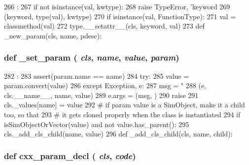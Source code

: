 \begin{DoxyCode}
266                                                :
267         if not isinstance(val, kwtype):
268             raise TypeError, 'keyword %
269                   (keyword, type(val), kwtype)
270         if isinstance(val, FunctionType):
271             val = classmethod(val)
272         type.__setattr__(cls, keyword, val)
273 
    def _new_param(cls, name, pdesc):
\end{DoxyCode}
\hypertarget{classm5_1_1SimObject_1_1MetaSimObject_ad9738835519febeb368f901e6185df14}{
\subsubsection[{\_\-set\_\-param}]{\setlength{\rightskip}{0pt plus 5cm}def \_\-set\_\-param ( {\em cls}, \/   {\em name}, \/   {\em value}, \/   {\em param})}}
\label{classm5_1_1SimObject_1_1MetaSimObject_ad9738835519febeb368f901e6185df14}



\begin{DoxyCode}
282                                            :
283         assert(param.name == name)
284         try:
285             value = param.convert(value)
286         except Exception, e:
287             msg = "%
288                   (e, cls.__name__, name, value)
289             e.args = (msg, )
290             raise
291         cls._values[name] = value
292         # if param value is a SimObject, make it a child too, so that
293         # it gets cloned properly when the class is instantiated
294         if isSimObjectOrVector(value) and not value.has_parent():
295             cls._add_cls_child(name, value)
296 
    def _add_cls_child(cls, name, child):
\end{DoxyCode}
\hypertarget{classm5_1_1SimObject_1_1MetaSimObject_af533aa789436bfde5727387a36ca9178}{
\subsubsection[{cxx\_\-param\_\-decl}]{\setlength{\rightskip}{0pt plus 5cm}def cxx\_\-param\_\-decl ( {\em cls}, \/   {\em code})}}
\label{classm5_1_1SimObject_1_1MetaSimObject_af533aa789436bfde5727387a36ca9178}



